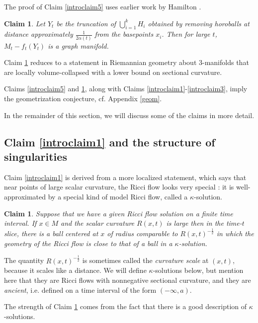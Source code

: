\documentclass[12pt]{amsart}
\numberwithin{equation}{section}
\theoremstyle{plain}
\newtheorem{claim}[equation]{Claim}
\theoremstyle{definition}
\theoremstyle{remark}
\begin{document}
The proof of Claim \ref{introclaim5} uses earlier work by
Hamilton \cite{Hamiltonn}.

\begin{claim} \cite{Perelman2,Shioya-Yamaguchi} \label{introclaim6}
Let $Y_t$ be the truncation of $\bigcup_{i=1}^k H_i$ obtained by
removing horoballs at distance approximately $\frac{1}{2 \alpha(t)}$
from the basepoints $x_i$. Then for large $t$, $M_t - f_t(Y_t)$ is
a graph manifold.
\end{claim}

Claim \ref{introclaim6} reduces to a statement in Riemannian geometry
about $3$-manifolds that are locally volume-collapsed with a lower
bound on sectional curvature.

Claims \ref{introclaim5} and \ref{introclaim6}, along with Claims
\ref{introclaim1}-\ref{introclaim3}, imply the geometrization conjecture,
cf. Appendix \ref{geom}.

In the remainder of this section, we will discuss some of the claims in 
more detail.


\subsection{Claim \ref{introclaim1} and the structure of singularities}
Claim \ref{introclaim1} is derived from a more localized statement, which
says that near points of large scalar curvature, the Ricci flow looks
very special : it is well-approximated by a special kind of
model Ricci flow, called a $\kappa$-solution.

\begin{claim}
\label{introclaim7}
Suppose that we have a given Ricci flow solution on a finite time interval.
If $x\in M$ and the scalar curvature $R(x,t)$ is large then 
in the time-$t$ slice,
there is a ball  centered at $x$
of radius comparable to $R(x,t)^{-\frac12}$ in which the geometry
of the Ricci flow 
is close to that of a ball in a $\kappa$-solution.
\end{claim}
The quantity $R(x,t)^{-\frac12}$ is sometimes called the {\em curvature scale}
at $(x,t)$, because it scales like a distance.  We will  define $\kappa$-solutions
below, but mention here that they are Ricci flows with nonnegative sectional curvature,
and they are {\em ancient}, i.e. defined on a time interval of the form
$(-\infty,a)$. 

The strength of Claim \ref{introclaim7} comes from the fact that there
is a good description of  $\kappa$-solutions.
 
\end{document}
